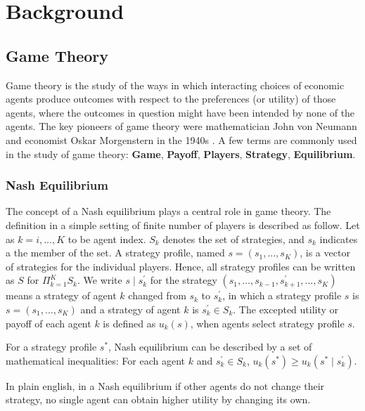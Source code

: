 \chapter{Background} \label{Chapter:Background}

\section{Game Theory}
Game theory is the study of the ways in which interacting choices of economic agents produce outcomes with respect to the preferences (or utility) of those agents, where the outcomes in question might have been intended by none of the agents\parencite{step-game-theory}. The key pioneers of game theory were mathematician John von Neumann and economist Oskar Morgenstern in the 1940s \parencite{10.2307/j.ctt1r2gkx}. A few terms are commonly used in the study of game theory: \textbf{Game}, \textbf{Payoff}, \textbf{Players}, \textbf{Strategy}, \textbf{Equilibrium}.

\subsection{Nash Equilibrium}
The concept of a Nash equilibrium plays a central role in game theory. The definition in a simple setting of finite number of players is described as follow. Let as $k=i, \dots, K$ to be agent index. $S_k$ denotes the set of strategies, and $s_k$ indicates a the member of the set. A strategy profile, named $s = (s_1, ..., s_K)$, is a vector of strategies for the individual players. Hence, all strategy profiles can be written as $S$ for $\Pi_{k=1}^{K} S_{k}$. We write $s \mid s_{k}^{\prime}$ for the strategy $\left(s_{1}, \ldots, s_{k-1}, s_{k+1}^{\prime}, \ldots, s_{K}\right)$ means a strategy of agent $k$ changed from $s_k$ to $s_{k}^{\prime}$, in which a strategy profile $s$ is $s = (s_1, ..., s_K)$ and a strategy of agent $k$ is $s_{k}^{\prime} \in S_{k}$. The excepted utility or payoff of each agent $k$ is defined as $u_k(s)$, when agents select strategy profile $s$\parencite{Kreps1989}.
\begin{proposition}
For a strategy profile $s^{*}$, Nash equilibrium can be described by a set of mathematical inequalities: For each agent $k$ and $s_{k}^{\prime} \in S_{k}$, $u_{k}(s^{*}) \geqslant u_{k}\left(s^{*} \mid s_{k}^{\prime}\right)$.
\end{proposition}
In plain english, in a Nash equilibrium if other agents do not change their strategy, no single agent can obtain higher utility by changing its own.
 
